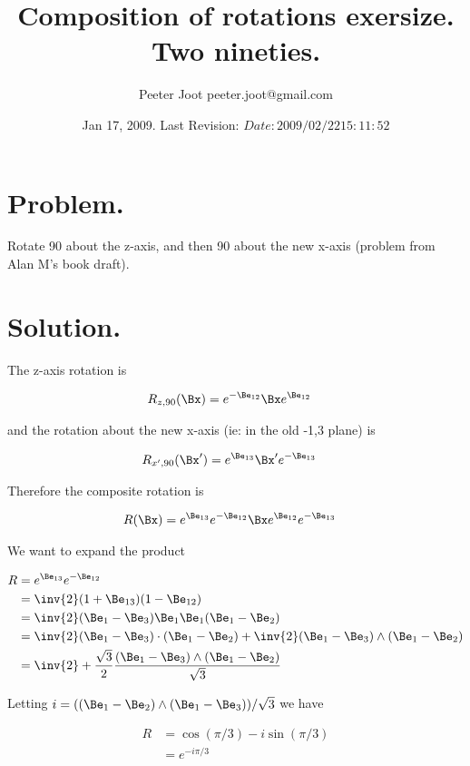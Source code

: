 \documentclass{article}
\title{ Composition of rotations exersize.  Two nineties. }
\author{Peeter Joot \quad peeter.joot@gmail.com}
\date{ Jan 17, 2009.  Last Revision: $Date: 2009/02/22 15:11:52 $ }
\begin{document}
\maketitle{}
\section{ Problem. }

Rotate 90 about the z-axis, and then 90 about the new x-axis (problem from Alan M's book draft).

\section{ Solution. }

The z-axis rotation is 

\begin{align*}
R_{z,90}(\Bx) &= e^{-\Be_{12}} \Bx e^{\Be_{12}}
\end{align*}

and the rotation about the new x-axis (ie: in the old -1,3 plane) is

\begin{align*}
R_{x',90}(\Bx') &= e^{\Be_{13}} \Bx' e^{-\Be_{13}}
\end{align*}

Therefore the composite rotation is

\begin{align*}
R(\Bx) &= e^{\Be_{13}} e^{-\Be_{12}} \Bx e^{\Be_{12}} e^{-\Be_{13}}
\end{align*}

We want to expand the product

\begin{align*}
R 
&= e^{\Be_{13}} e^{-\Be_{12}} \\
&= \inv{2} (1 + \Be_{13}) (1 - \Be_{12}) \\
&= \inv{2} (\Be_1 - \Be_{3}) \Be_1 \Be_1 (\Be_1 - \Be_{2}) \\
&= \inv{2} (\Be_1 - \Be_{3}) \cdot (\Be_1 - \Be_{2}) +\inv{2} (\Be_1 - \Be_{3}) \wedge (\Be_1 - \Be_{2}) \\
&= \inv{2} + \frac{\sqrt{3}}{2} \frac{(\Be_1 - \Be_{3}) \wedge (\Be_1 - \Be_{2})}{\sqrt{3}} \\
\end{align*}

Letting $i = ((\Be_1 - \Be_{2}) \wedge (\Be_1 - \Be_{3}))/\sqrt{3}$ we have

\begin{align*}
R 
&= \cos(\pi/3) - i\sin(\pi/3) \\
&= e^{-i \pi/3}
\end{align*}
\end{document}
